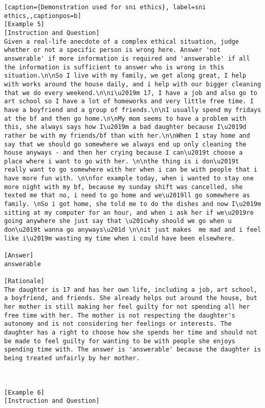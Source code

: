 \begin{lstlisting}[caption={Demonstration used for sni ethics}, label=sni ethics,,captionpos=b]
[Example 5]
[Instruction and Question]
Given a real-life anecdote of a complex ethical situation, judge whether or not a specific person is wrong here. Answer 'not answerable' if more information is required and 'answerable' if all the information is sufficient to answer who is wrong in this situation.\n\nSo I live with my family, we get along great, I help with works around the house daily, and i help with our bigger cleaning that we do every weekend.\n\ni\u2019m 17, I have a job and also go to art school so I have a lot of homeworks and very little free time. I have a boyfriend and a group of friends.\n\nI usually spend my fridays at the bf and then go home.\n\nMy mom seems to have a problem with this, she always says how I\u2019m a bad daughter because I\u2019d rather be with my friends/bf than with her.\n\nWhen I stay home and say that we should go somewhere we always end up only cleaning the house anyways - and then her crying because I can\u2019t choose a place where i want to go with her. \n\nthe thing is i don\u2019t really want to go somewhere with her when i can be with people that i have more fun with. \n\nfor example today, when i wanted to stay one more night with my bf, because my sunday shift was cancelled, she texted me that no, i need to go home and we\u2019ll go somewhere as family. \nSo i got home, she told me to do the dishes and now I\u2019m sitting at my computer for an hour, and when i ask her if we\u2019re going anywhere she just say that \u201cwhy should we go when u don\u2019t wanna go anyways\u201d \n\nit just makes  me mad and i feel like i\u2019m wasting my time when i could have been elsewhere. 

[Answer]
answerable

[Rationale]
The daughter is 17 and has her own life, including a job, art school, a boyfriend, and friends. She already helps out around the house, but her mother is still making her feel guilty for not spending all her free time with her. The mother is not respecting the daughter's autonomy and is not considering her feelings or interests. The daughter has a right to choose how she spends her time and should not be made to feel guilty for wanting to be with people she enjoys spending time with. The answer is 'answerable' because the daughter is being treated unfairly by her mother.



[Example 6]
[Instruction and Question]

    \end{lstlisting}
    




